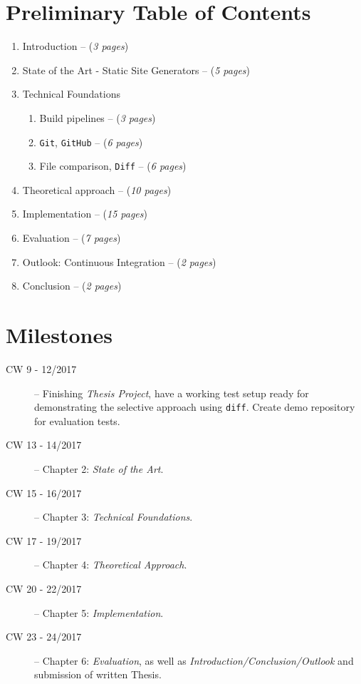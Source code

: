\documentclass[a4paper,english,11pt]{article}
\begin{document}
\section{Preliminary Table of Contents}
\begin{enumerate}
\item Introduction -- (\emph{3 pages})
\item State of the Art - Static Site Generators -- (\emph{5 pages})
\item Technical Foundations

\begin{enumerate}
\item Build pipelines -- (\emph{3 pages})
\item \texttt{Git}, \texttt{GitHub} -- (\emph{6 pages})
\item File comparison, \texttt{Diff} -- (\emph{6 pages})
\end{enumerate}
\item Theoretical approach -- (\emph{10 pages})
\item Implementation -- (\emph{15 pages})
\item Evaluation -- (\emph{7 pages})
\item Outlook: Continuous Integration -- (\emph{2 pages})
\item Conclusion -- (\emph{2 pages})
\end{enumerate}

\section{Milestones}
\begin{description}
\item [CW 9 - 12/2017] -- Finishing \emph{Thesis Project}, have a working test setup ready for demonstrating the selective approach using \texttt{diff}. Create demo repository for evaluation tests.
\item[CW 13 - 14/2017] -- Chapter 2: \emph{State of the Art}.
\item[CW 15 - 16/2017] -- Chapter 3: \emph{Technical Foundations}.
\item [CW 17 - 19/2017] -- Chapter 4: \emph{Theoretical Approach}.
\item [CW 20 - 22/2017] -- Chapter 5: \emph{Implementation}.
\item [CW 23 - 24/2017] -- Chapter 6: \emph{Evaluation}, as well as \emph{Introduction/Conclusion/Outlook} and submission of written Thesis.
\end{description}
\end{document}
